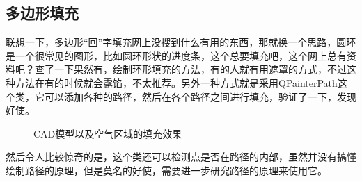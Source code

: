 \subsection{多边形填充}
联想一下，多边形“回”字填充网上没搜到什么有用的东西，那就换一个思路，圆环是一个很常见的图形，比如圆环形状的进度条，这个总要填充吧，这个网上总有资料吧？查了一下果然有，绘制环形填充的方法，有的人就有用遮罩的方式，不过这种方法在有的时候就会露馅，不太推荐。另外一种方式就是采用QPainterPath这个类，它可以添加各种的路径，然后在各个路径之间进行填充，验证了一下，发现好使。
\begin{figure}[htbp]
	\centering
	\hspace{0.16 \linewidth}
	\caption{CAD模型以及空气区域的填充效果}
\end{figure}
然后令人比较惊奇的是，这个类还可以检测点是否在路径的内部，虽然并没有搞懂绘制路径的原理，但是莫名的好使，需要进一步研究路径的原理来使用它。

